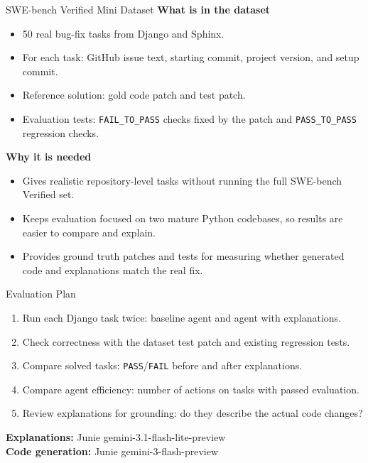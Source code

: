 \documentclass[17pt,aspectratio=169]{beamer}
\begin{document}
\begin{frame}[t]{SWE-bench Verified Mini Dataset}
\scriptsize
\setlength{\leftmargini}{1.2em}
\textbf{What is in the dataset}
\begin{itemize}\setlength{\itemsep}{0.08cm}
    \item 50 real bug-fix tasks from Django and Sphinx.
    \item For each task: GitHub issue text, starting commit, project version, and setup commit.
    \item Reference solution: gold code patch and test patch.
    \item Evaluation tests: \texttt{FAIL\_TO\_PASS} checks fixed by the patch and \texttt{PASS\_TO\_PASS} regression checks.
\end{itemize}

\vspace{0.05cm}
\textbf{Why it is needed}
\begin{itemize}\setlength{\itemsep}{0.08cm}
    \item Gives realistic repository-level tasks without running the full SWE-bench Verified set.
    \item Keeps evaluation focused on two mature Python codebases, so results are easier to compare and explain.
    \item Provides ground truth patches and tests for measuring whether generated code and explanations match the real fix.
\end{itemize}
\end{frame}

\begin{frame}[t]{Evaluation Plan}
\scriptsize
\begin{enumerate}\setlength{\itemsep}{0.12cm}
    \item Run each Django task twice: baseline agent and agent with explanations.
    \item Check correctness with the dataset test patch and existing regression tests.
    \item Compare solved tasks: \texttt{PASS}/\texttt{FAIL} before and after explanations.
    \item Compare agent efficiency: number of actions on tasks with passed evaluation.
    \item Review explanations for grounding: do they describe the actual code changes?
\end{enumerate}

\vspace{0.18cm}
\textbf{Explanations:} Junie gemini-3.1-flash-lite-preview\\
\textbf{Code generation:} Junie gemini-3-flash-preview
\end{frame}
\end{document}
